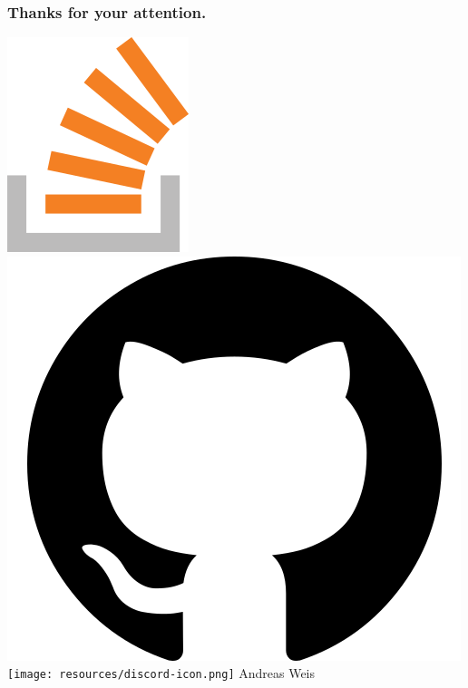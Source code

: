 \documentclass[aspectratio=169]{beamer}
\begin{document}
\begin{frame}
  \frametitle{Thanks for your attention.}

  \href{https://stackoverflow.com/users/577603/comicsansms}{\includegraphics[height=.05\textheight]{resources/so-icon.png}}
  \href{https://github.com/ComicSansMS}{\includegraphics[height=.05\textheight]{resources/github-icon.png}}
  \texttt{[image: resources/discord-icon.png]} Andreas Weis
\end{frame}
\end{document}
